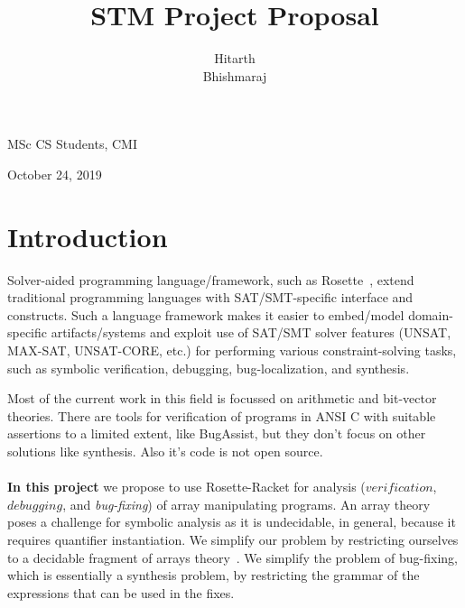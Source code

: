\documentclass[a4paper, 12pt, notitlepage] {article}
\author{Hitarth \\ Bhishmaraj}
\title{STM Project Proposal}
\date{} %
\newcommand{\hide}[1]{}
\newcommand{\mscmt}[1]{{\color{blue} \tiny{Srivas: {#1}}}}
\begin{document}
\maketitle		


\begin{center}
MSc CS Students, CMI
\end{center}
\begin{center}
October 24, 2019
\end{center}
\newpage

\section{Introduction}

Solver-aided programming language/framework, such as Rosette~\cite{??}, extend traditional programming languages with SAT/SMT-specific interface and constructs.
Such a language framework makes it easier to embed/model domain-specific artifacts/systems and exploit use of SAT/SMT solver features (UNSAT, MAX-SAT, UNSAT-CORE, etc.) for performing various constraint-solving tasks, such as symbolic verification, debugging, bug-localization, and synthesis.
%
\hide{
domain-specific languages (SDSLs) are the languages, for a specific domain, which ease the construction of programs by giving us the ability to automate the taksk like verification, debugging and synthesis. But implementing the SDSLs from the scretch is a very hard task. To simplify our taks, we use Rosette \cite{rosette_paper}. Rosette is a framework for designing solver-aided languages, and is itself a solver-aided language embedded in Racket. Rosette helps us to easily exploit the power of SAT//SMT solver in designing solutions to domain specific constraint solving problems.\\
\\
}
%
Most of the current work in this field is focussed on arithmetic and bit-vector theories. There are tools for verification of programs in ANSI C with suitable assertions to  a limited extent, like BugAssist\cite{bugassist}, but they don't focus on other solutions like synthesis. Also it's code is not open source.\\
 \\
{\bf In this project} we propose to use Rosette-Racket for analysis ($verification$, $debugging$, and \emph{bug-fixing}) of array manipulating programs.
An array theory poses a challenge for symbolic analysis as it is undecidable, in general, because it requires quantifier instantiation.
We simplify our problem by restricting ourselves to a decidable fragment of arrays theory~\cite{weakeqarrays}.
We simplify the problem of bug-fixing, which is essentially a synthesis problem, by restricting the grammar of the expressions that can be used in the fixes.
\end{document}
